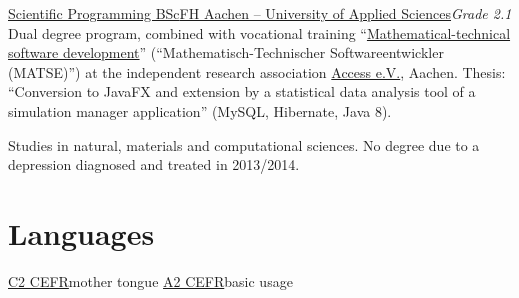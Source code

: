 \documentclass[11pt,a4paper]{moderncv}
\begin{document}

{\href{https://www.fh-aachen.de/en/course-of-study/angewandte-mathematik-und-informatik-bsc/}{Scientific
    Programming BSc}}{\href{https://www.fh-aachen.de/}{FH Aachen -- University
    of Applied Sciences}}{}{\textit{Grade 2.1}}
{Dual degree program, combined with vocational training
  \enquote{\href{http://www.rwth-aachen.de/cms/root/Die-RWTH/Jobs-Ausbildung/Berufsausbildung/Ausbildungsberufe/~vsa/Math-techn-Softwareentwickler/?lidx=1}{Mathematical-technical
    software development}} (\enquote{Mathematisch-Technischer Softwareentwickler
  (MATSE)}) at the independent research association
\href{https://access-technology.de/}{Access e.V.}, Aachen. Thesis:
  \enquote{Conversion to JavaFX and extension by a statistical data analysis tool of a
  simulation manager application} (MySQL, Hibernate, Java 8).}


{Studies in natural, materials and computational sciences. No degree due to a depression diagnosed and treated in 2013/2014.}


\section{Languages}

 {\href{https://www.coe.int/en/web/common-european-framework-reference-languages/level-descriptions}{C2 CEFR}}{mother tongue}
 {\href{https://www.coe.int/en/web/common-european-framework-reference-languages/level-descriptions}{A2 CEFR}}{basic usage}
\end{document}
